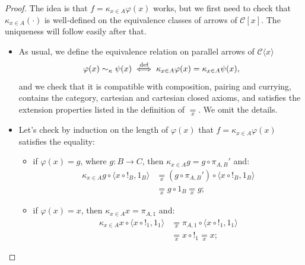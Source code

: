 \begin{proof}
    The idea is that $f = \kappa_{x \in A}\varphi(x)$ works, but we first need to check that $\kappa_{x \in A}(\cdot)$ is well-defined on the equivalence classes of arrows of $\mathcal C[x]$. The uniqueness will follow easily after that.\newline
    \begin{itemize}
        \item[$\boxed{\begin{array}{c}\textnormal{well-}\\\textnormal{definedness}\end{array}}$] As usual, we define the equivalence relation on parallel arrows of $\mathcal C\langle x\rangle$
        \[ \varphi(x) \sim_{\kappa} \psi(x) \overset{\textnormal{def}}{\iff} \kappa_{x \in A}\varphi(x) = \kappa_{x \in A}\psi(x), \]
        and we check that it is compatible with composition, pairing and currying, contains the category, cartesian and cartesian closed axioms, and satisfies the extension properties listed in the definition of $\underset{x}{=}$. We omit the details.
        \item[$\boxed{\begin{array}{c}\kappa_{x \in A}\varphi(x)\\\textnormal{works}\end{array}}$] Let's check by induction on the length of $\varphi(x)$ that $f = \kappa_{x \in A}\varphi(x)$ satisfies the equality:
        \begin{itemize}
            \item if $\varphi(x) = g$, where $g : B \to C$, then $\kappa_{x \in A}g = g \circ \pi_{A,B}'$ and:
            \begin{align*}
                \kappa_{x \in A}g \circ \langle x \circ !_B, 1_B\rangle &\underset{x}{=} (g \circ \pi_{A,B}') \circ \langle x \circ !_B, 1_B\rangle \\
                                                                        &\underset{x}{=} g \circ 1_B \underset{x}{=} g;
            \end{align*}
            \item if $\varphi(x) = x$, then $\kappa_{x \in A}x = \pi_{A,1}$ and:
            \begin{align*}
                \kappa_{x \in A}x \circ \langle x \circ !_1, 1_1\rangle &\underset{x}{=} \pi_{A,1} \circ \langle x \circ !_1, 1_1\rangle \\
                                                                        &\underset{x}{=} x \circ !_1 \underset{x}{=} x;

\end{align*}
\end{itemize}
\end{itemize}
\end{proof}
